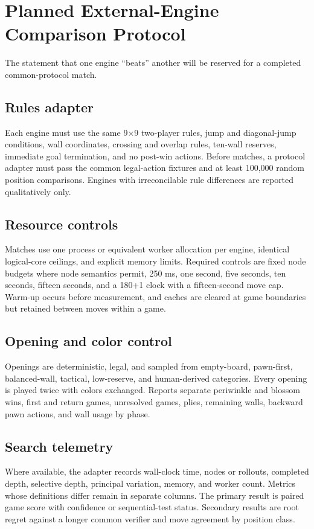 \section{Planned External-Engine Comparison Protocol}
The statement that one engine ``beats'' another will be reserved for a completed common-protocol match.

\subsection{Rules adapter}
Each engine must use the same 9$\times$9 two-player rules, jump and diagonal-jump conditions, wall coordinates, crossing and overlap rules, ten-wall reserves, immediate goal termination, and no post-win actions. Before matches, a protocol adapter must pass the common legal-action fixtures and at least 100,000 random position comparisons. Engines with irreconcilable rule differences are reported qualitatively only.

\subsection{Resource controls}
Matches use one process or equivalent worker allocation per engine, identical logical-core ceilings, and explicit memory limits. Required controls are fixed node budgets where node semantics permit, 250 ms, one second, five seconds, ten seconds, fifteen seconds, and a 180+1 clock with a fifteen-second move cap. Warm-up occurs before measurement, and caches are cleared at game boundaries but retained between moves within a game.

\subsection{Opening and color control}
Openings are deterministic, legal, and sampled from empty-board, pawn-first, balanced-wall, tactical, low-reserve, and human-derived categories. Every opening is played twice with colors exchanged. Reports separate periwinkle and blossom wins, first and return games, unresolved games, plies, remaining walls, backward pawn actions, and wall usage by phase.

\subsection{Search telemetry}
Where available, the adapter records wall-clock time, nodes or rollouts, completed depth, selective depth, principal variation, memory, and worker count. Metrics whose definitions differ remain in separate columns. The primary result is paired game score with confidence or sequential-test status. Secondary results are root regret against a longer common verifier and move agreement by position class.

